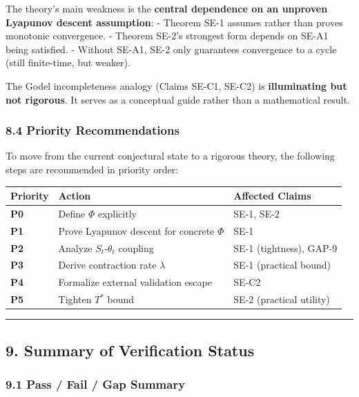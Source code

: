 \documentclass[
  12pt,
]{article}
\begin{document}
The theory's main weakness is the \textbf{central dependence on an
unproven Lyapunov descent assumption}: - Theorem SE-1 assumes rather
than proves monotonic convergence. - Theorem SE-2's strongest form
depends on SE-A1 being satisfied. - Without SE-A1, SE-2 only guarantees
convergence to a cycle (still finite-time, but weaker).

The Godel incompleteness analogy (Claims SE-C1, SE-C2) is
\textbf{illuminating but not rigorous}. It serves as a conceptual guide
rather than a mathematical result.

\subsubsection{8.4 Priority
Recommendations}\label{priority-recommendations}

To move from the current conjectural state to a rigorous theory, the
following steps are recommended in priority order:

\begin{longtable}[]{@{}lll@{}}
\toprule\noalign{}
Priority & Action & Affected Claims \\
\midrule\noalign{}
\endhead
\bottomrule\noalign{}
\endlastfoot
\textbf{P0} & Define \(\Phi\) explicitly & SE-1, SE-2 \\
\textbf{P1} & Prove Lyapunov descent for concrete \(\Phi\) & SE-1 \\
\textbf{P2} & Analyze \(S_t\)-\(\theta_t\) coupling & SE-1 (tightness),
GAP-9 \\
\textbf{P3} & Derive contraction rate \(\lambda\) & SE-1 (practical
bound) \\
\textbf{P4} & Formalize external validation escape & SE-C2 \\
\textbf{P5} & Tighten \(T^*\) bound & SE-2 (practical utility) \\
\end{longtable}

\begin{center}\rule{0.5\linewidth}{0.5pt}\end{center}

\subsection{9. Summary of Verification
Status}\label{summary-of-verification-status}

\subsubsection{9.1 Pass / Fail / Gap
Summary}\label{pass-fail-gap-summary}
\end{document}
